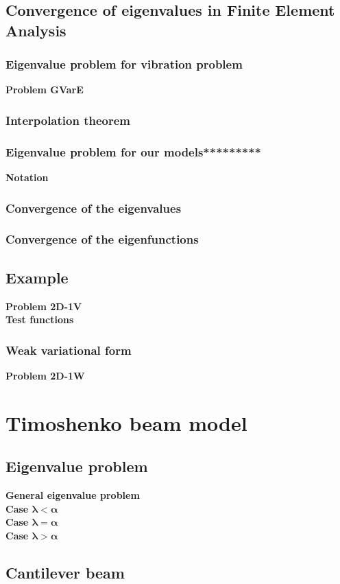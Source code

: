 \documentclass[../main.tex]{subfiles}
\begin{document}
\subsection{Convergence of eigenvalues in Finite Element Analysis}
\subsubsection{Eigenvalue problem for vibration problem}
\textbf{Problem GVarE}
\subsubsection{Interpolation theorem}
\subsubsection{Eigenvalue problem for our models*********}
\textbf{Notation}
\subsubsection{Convergence of the eigenvalues}
\subsubsection{Convergence of the eigenfunctions}
\subsection{Example}
\textbf{Problem 2D-1V}\\
\textbf{Test functions}
\subsubsection{Weak variational form}
\textbf{Problem 2D-1W}
\section{Timoshenko beam model}
\subsection{Eigenvalue problem}
\textbf{General eigenvalue problem}\\
\textbf{Case $\bm {\lambda <\alpha }$}\\
\textbf{Case $\bm { \lambda =\alpha }$}\\
\textbf{Case $\bm {\lambda >\alpha }$}
\subsection{Cantilever beam}
\end{document}
